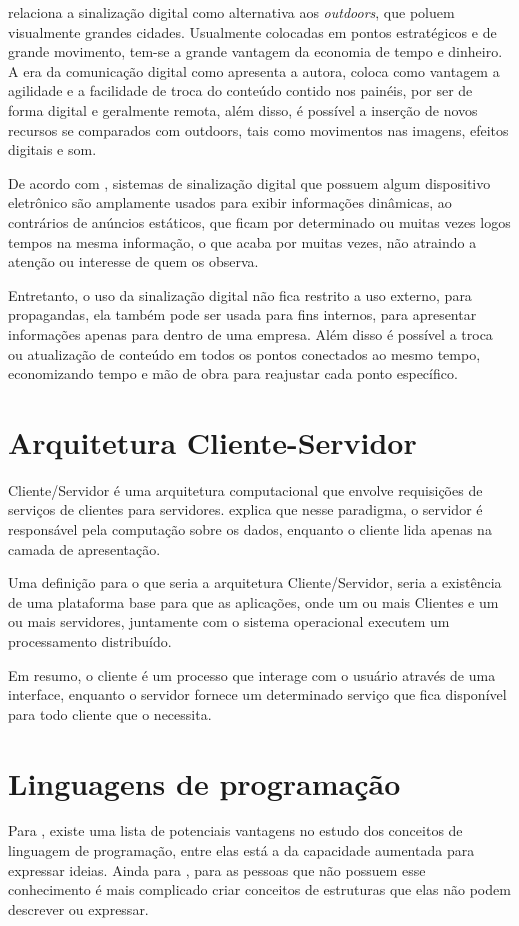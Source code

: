 \citet[p.11]{cintra2010} relaciona a sinalização digital como alternativa aos \textit{outdoors}, que poluem visualmente grandes cidades. Usualmente colocadas em pontos estratégicos e de grande movimento, tem-se a grande vantagem da economia de tempo e dinheiro. A era da comunicação digital como apresenta a autora, coloca como vantagem a agilidade e a facilidade de troca do conteúdo contido nos painéis, por ser de forma digital e geralmente remota, além disso, é possível a inserção de novos recursos se comparados com outdoors, tais como movimentos nas imagens, efeitos digitais e som.

De acordo com \citet{mishima2016}, sistemas de sinalização
digital que possuem algum dispositivo eletrônico são amplamente usados para exibir informações dinâmicas, ao contrários de anúncios estáticos, que ficam por determinado ou muitas vezes logos tempos na mesma informação, o que acaba por muitas vezes, não atraindo a atenção ou interesse de quem os observa.

Entretanto, o uso da sinalização digital não fica restrito a uso externo, para propagandas, ela também pode ser usada para fins internos, para apresentar informações apenas para dentro de uma empresa. Além disso é possível a troca ou atualização de conteúdo em todos os pontos conectados ao mesmo tempo, economizando tempo e mão de obra para reajustar cada ponto específico.

\section{Arquitetura Cliente-Servidor}
Cliente/Servidor é uma arquitetura computacional que envolve requisições de serviços de clientes para servidores. \citet{cecin2005} explica que nesse paradigma, o servidor é responsável pela computação sobre os dados, enquanto o cliente lida apenas na camada de apresentação.

Uma definição para o que seria a arquitetura Cliente/Servidor, seria a existência de uma plataforma base para que as aplicações, onde um ou mais Clientes e um ou mais servidores, juntamente com o sistema operacional executem um processamento distribuído.

Em resumo, o cliente é um processo que interage com o usuário através de uma interface, enquanto o servidor fornece um determinado serviço que fica disponível para todo cliente que o necessita.

\section{Linguagens de programação}
Para \citet{sebesta2011}, existe uma lista de potenciais vantagens no estudo dos conceitos de linguagem de programação, entre elas está a da capacidade aumentada para expressar ideias. Ainda para \citet{sebesta2011}, para as pessoas que não possuem esse conhecimento é mais complicado criar conceitos de estruturas que elas não podem descrever ou expressar. 

